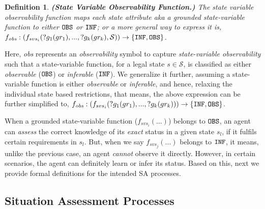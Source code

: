 \documentclass[letterpaper]{article} %
\newtheorem{definition}{Definition}
\begin{document}
\begin{definition} \label{def:svof}
\textbf{(State Variable Observability Function.)} 
The state variable observability function maps each state attribute {\em aka} a grounded \textit{state-variable function} 
to either $\texttt{OBS}$ or $\texttt{INF}$; or a more general way to express it is, $f_{\textit{obs}}: (f_{svs_i}(?g_1(gr_1),...,?g_k(gr_k),\mathcal{S}
)) \rightarrow 
    \{\texttt{INF}, \texttt{OBS}\}$.
\end{definition}
Here, \textit{obs} represents an \textit{observability} symbol to capture \textit{state-variable observability} such that a state-variable function, for a legal state $s\in\mathcal{S}$, is classified as either \textit{observable} ($\texttt{OBS}$) or \textit{inferable} ($\texttt{INF}$). 
We generalize it further, assuming a state-variable function is either \textit{observable} or \textit{inferable}, and hence, relaxing the individual state based restrictions, that means, the above expression can be further simplified to, 
$f_{\textit{obs}}: (f_{svs_i}(?g_1(gr_1),...,?g_k(gr_k))) \rightarrow \{\texttt{INF}, \texttt{OBS}\}$.

When a grounded state-variable function ($f_{svs_i}(...)$) belongs to $\texttt{OBS}$, an agent can \textit{assess} the correct knowledge of its \textit{exact} status in a given state $s_l$, if it fulfils certain requirements in $s_l$. 
But, when we say $f_{svs_j}(...)$ belongs to $\texttt{INF}$, it means, unlike the previous case, an agent \textit{cannot} observe it directly. 
However, in certain scenarios, the agent can definitely learn or infer its status. Based on this, next we provide formal definitions for the intended SA processes.

\subsection{Situation Assessment Processes}
\end{document}
